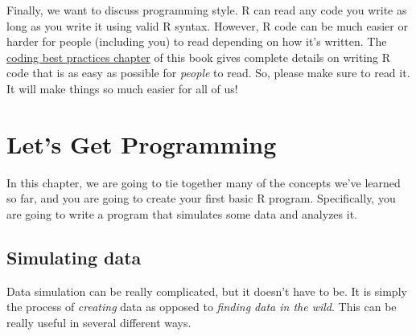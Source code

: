 \documentclass[
  letterpaper,
  DIV=11,
  numbers=noendperiod]{scrreprt}
\begin{document}
Finally, we want to discuss programming style. R can read any code you
write as long as you write it using valid R syntax. However, R code can
be much easier or harder for people (including you) to read depending on
how it's written. The \hyperref[coding-best-practices]{coding best
practices chapter} of this book gives complete details on writing R code
that is as easy as possible for \emph{people} to read. So, please make
sure to read it. It will make things so much easier for all of us!

\chapter{Let's Get Programming}\label{lets-get-programming}

In this chapter, we are going to tie together many of the concepts we've
learned so far, and you are going to create your first basic R program.
Specifically, you are going to write a program that simulates some data
and analyzes it.

\section{Simulating data}\label{simulating-data}

Data simulation can be really complicated, but it doesn't have to be. It
is simply the process of \emph{creating} data as opposed to
\emph{finding data in the wild}. This can be really useful in several
different ways.
\end{document}
